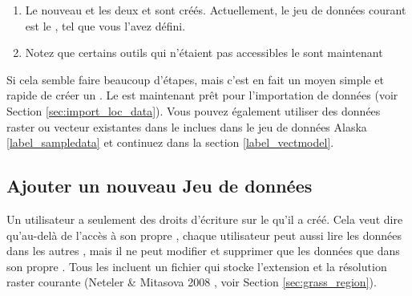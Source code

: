 \begin{enumerate}
  \item Le nouveau  et les deux  et  sont créés. Actuellement, le jeu de données courant est le , tel que vous l'avez défini.
  \item Notez que certains outils qui n'étaient pas accessibles le sont maintenant
\end{enumerate}

Si cela semble faire beaucoup d'étapes, mais c'est en fait un moyen simple et rapide de créer un . Le  est maintenant prêt pour l'importation de données (voir Section \ref{sec:import_loc_data}). Vous pouvez également utiliser des données raster ou vecteur existantes dans le  inclues dans le jeu de données \qg Alaska \ref{label_sampledata} et continuez dans la section \ref{label_vectmodel}.

\subsection{Ajouter un nouveau Jeu de données}\label{sec:add_mapset}

Un utilisateur a seulement des droits d'écriture sur le  \grass qu'il a créé. Cela veut dire qu'au-delà de l'accès à son propre  \grass, chaque utilisateur peut aussi lire les données dans les autres , mais il ne peut modifier et supprimer que les données que dans son propre . Tous les  incluent un fichier  qui stocke l'extension et la résolution raster courante (Neteler \& Mitasova 2008 \cite{neteler_mitasova08}, voir Section \ref{sec:grass_region}).

